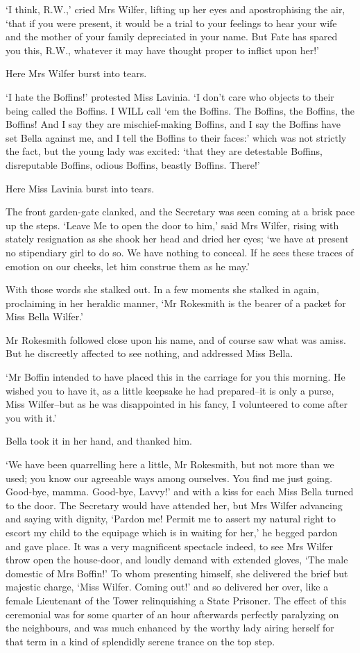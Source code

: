 ‘I think, R.W.,’ cried Mrs Wilfer, lifting up her eyes and
apostrophising the air, ‘that if you were present, it would be a
trial to your feelings to hear your wife and the mother of your family
depreciated in your name. But Fate has spared you this, R.W., whatever
it may have thought proper to inflict upon her!’

Here Mrs Wilfer burst into tears.

‘I hate the Boffins!’ protested Miss Lavinia. ‘I don’t care who objects
to their being called the Boffins. I WILL call ‘em the Boffins. The
Boffins, the Boffins, the Boffins! And I say they are mischief-making
Boffins, and I say the Boffins have set Bella against me, and I tell the
Boffins to their faces:’ which was not strictly the fact, but the
young lady was excited: ‘that they are detestable Boffins, disreputable
Boffins, odious Boffins, beastly Boffins. There!’

Here Miss Lavinia burst into tears.

The front garden-gate clanked, and the Secretary was seen coming at a
brisk pace up the steps. ‘Leave Me to open the door to him,’ said Mrs
Wilfer, rising with stately resignation as she shook her head and dried
her eyes; ‘we have at present no stipendiary girl to do so. We have
nothing to conceal. If he sees these traces of emotion on our cheeks,
let him construe them as he may.’

With those words she stalked out. In a few moments she stalked in again,
proclaiming in her heraldic manner, ‘Mr Rokesmith is the bearer of a
packet for Miss Bella Wilfer.’

Mr Rokesmith followed close upon his name, and of course saw what was
amiss. But he discreetly affected to see nothing, and addressed Miss
Bella.

‘Mr Boffin intended to have placed this in the carriage for you
this morning. He wished you to have it, as a little keepsake he had
prepared--it is only a purse, Miss Wilfer--but as he was disappointed in
his fancy, I volunteered to come after you with it.’

Bella took it in her hand, and thanked him.

‘We have been quarrelling here a little, Mr Rokesmith, but not more than
we used; you know our agreeable ways among ourselves. You find me just
going. Good-bye, mamma. Good-bye, Lavvy!’ and with a kiss for each Miss
Bella turned to the door. The Secretary would have attended her, but
Mrs Wilfer advancing and saying with dignity, ‘Pardon me! Permit me to
assert my natural right to escort my child to the equipage which is
in waiting for her,’ he begged pardon and gave place. It was a very
magnificent spectacle indeed, to see Mrs Wilfer throw open the
house-door, and loudly demand with extended gloves, ‘The male domestic
of Mrs Boffin!’ To whom presenting himself, she delivered the brief but
majestic charge, ‘Miss Wilfer. Coming out!’ and so delivered her over,
like a female Lieutenant of the Tower relinquishing a State Prisoner.
The effect of this ceremonial was for some quarter of an hour afterwards
perfectly paralyzing on the neighbours, and was much enhanced by the
worthy lady airing herself for that term in a kind of splendidly serene
trance on the top step.

